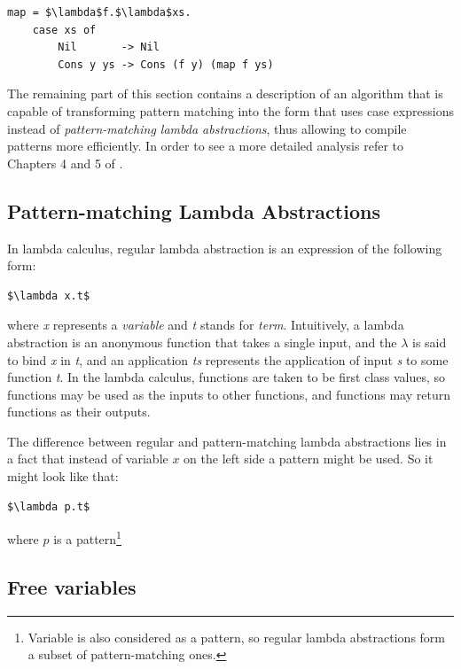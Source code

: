 \documentclass[12pt,a4paper]{report}
\begin{document}
\vspace*{0.2in}
\begin{lstlisting}[style=haskell,mathescape=true]
map = $\lambda$f.$\lambda$xs.
    case xs of
        Nil       -> Nil
        Cons y ys -> Cons (f y) (map f ys)
\end{lstlisting}

The remaining part of this section contains a description of an algorithm that
is capable of transforming pattern matching into the form that uses case
expressions instead of \textit{pattern-matching lambda abstractions}, thus allowing to
compile patterns more efficiently. In order to see a more detailed analysis
refer to Chapters 4 and 5 of \cite{Jon87}.

\subsection{Pattern-matching Lambda Abstractions}
In lambda calculus, regular lambda abstraction is an expression of the
following form:

\vspace*{0.2in}
\begin{lstlisting}[style=haskell,mathescape=true]
$\lambda x.t$
\end{lstlisting}
where \textit{x} represents a \textit{variable} and \textit{t} stands for
\textit{term}. Intuitively, a lambda abstraction is an anonymous function that
takes a single input, and the \(\lambda\) is said to bind \textit{x} in
\textit{t}, and an application \textit{ts} represents the application of input
\textit{s} to some function \textit{t}. In the lambda calculus, functions are
taken to be first class values, so functions may be used as the inputs to other
functions, and functions may return functions as their outputs.

The difference between regular and pattern-matching lambda abstractions lies in
a fact that instead of variable $x$ on the left side a pattern might be
used. So it might look like that:

\vspace*{0.2in}
\begin{lstlisting}[style=haskell,mathescape=true]
$\lambda p.t$
\end{lstlisting}
where $p$ is a pattern\footnote{Variable is also considered as a
pattern, so regular lambda abstractions form a subset of pattern-matching ones.}

\subsection{Free variables}
\label{sec:free_variable}
\end{document}
